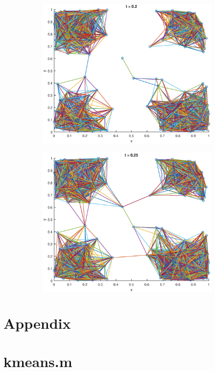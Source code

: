 \documentclass[10pt]{article}
\begin{document}
\begin{figure}[H]
\begin{subfigure}[b]{.49\textwidth}
	   	\includegraphics[width=\columnwidth]{Ass1_20.eps}
	   	\caption{}
	   	\label{fig1d}
	\end{subfigure}
	\begin{subfigure}[b]{.49\textwidth}
		\includegraphics[width=\columnwidth]{Ass1_25.eps}
		\caption{}
		\label{fig1e}
	\end{subfigure}	
  \label{fig1.1}
\end{figure}

\newpage
\section*{Appendix}
\appendix
\section{kmeans.m}
{\label{Minkowski}}
\end{document}
